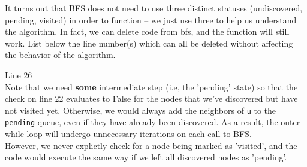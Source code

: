 \begin{prob}

        It turns out that BFS does not need to use three distinct statuses
        (undiscovered, pending, visited) in order to
        function -- we just use three to help us understand the algorithm.  In
        fact, we can delete code from bfs, and the
        function will still work. List below the line number(s) which can all
        be deleted without affecting the behavior of the algorithm.

        \begin{soln}
            Line 26\\
            Note that we need \textbf{some} intermediate step (i.e, the 'pending' state) so that the check on
            line 22 evaluates to False for the nodes that we've discovered but have not visited yet. 
            Otherwise, we would always add the neighbors of \texttt{u} to the \texttt{pending} queue, even if they
            have already been discovered. As a result, the outer while loop will undergo unnecessary iterations on each call to BFS.\\

            However, we never explictly check for a node being marked as 'visited', and the code would execute 
            the same way if we left all discovered nodes as 'pending'.
        \end{soln}

\end{prob}
